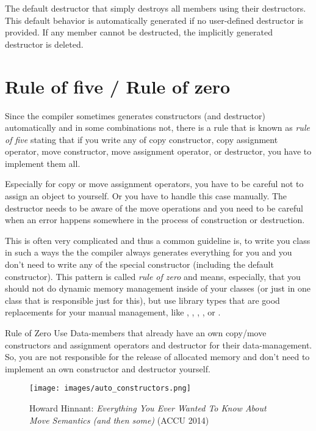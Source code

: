 The default destructor that simply destroys all members using their destructors. This default behavior is automatically generated if
no user-defined destructor is provided. If any member cannot be destructed, the implicitly generated destructor is deleted.

\section{Rule of five / Rule of zero}

Since the compiler sometimes generates constructors (and destructor) automatically and in some combinations not, there is a rule that is known as
\emph{rule of five} stating that if you write any of copy constructor, copy assignment operator, move constructor, move assignment operator, or destructor,
you have to implement them all.

Especially for copy or move assignment operators, you have to be careful not to assign an object to yourself. Or you have to handle this case manually. The
destructor needs to be aware of the move operations and you need to be careful when an error happens somewhere in the process of construction or destruction.

This is often very complicated and thus a common guideline is, to write you class in such a ways the the compiler always generates everything for you and you
don't need to write any of the special constructor (including the default constructor). This pattern is called \emph{rule of zero} and means, especially,
that you should not do dynamic memory management inside of your classes (or just in one class that is responsible just for this), but use library types that
are good replacements for your manual management, like , , , , or .

\begin{guideline}{Rule of Zero}
  Use Data-members that already have an own copy/move constructors and assignment operators and destructor for their data-management. So, you are not
  responsible for the release of allocated memory and don't need to implement an own constructor and destructor yourself.
\end{guideline}

\begin{figure}[ht]
\begin{center}
\texttt{[image: images/auto\_constructors.png]}
\caption{Howard Hinnant: \emph{Everything You Ever Wanted To Know About Move Semantics (and then some)} (ACCU 2014)}
\end{center}
\end{figure}

